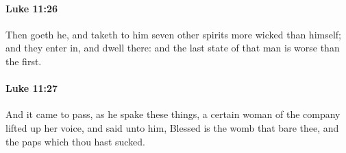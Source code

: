 		\paragraph{Luke 11:26} %
			\label{LUKE-11-26}

			Then goeth he, and taketh to him seven other spirits more wicked than himself; and they enter in, and dwell there: and the last state of that man is worse than the first.

			\begin{framed}
			\scriptsize
				\begin{compactdesc}
					\item[SBLG] 
				\end{compactdesc}
			\end{framed}

		\paragraph{Luke 11:27} %
			\label{LUKE-11-27}

			And it came to pass, as he spake these things, a certain woman of the company lifted up her voice, and said unto him, Blessed is the womb that bare thee, and the paps which thou hast sucked.

